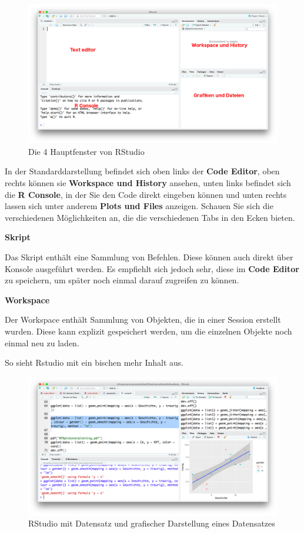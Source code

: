 \documentclass[]{book}
\begin{document}
\begin{figure}
\centering
\includegraphics{./img/RStudio-look.png}
\caption{Die 4 Hauptfenster von RStudio}
\end{figure}

In der Standarddarstellung befindet sich oben links der \textbf{Code
Editor}, oben rechts können sie \textbf{Workspace und History} ansehen,
unten links befindet sich die \textbf{R Console}, in der Sie den Code
direkt eingeben können und unten rechts lassen sich unter anderem
\textbf{Plots und Files} anzeigen. Schauen Sie sich die verschiedenen
Möglichkeiten an, die die verschiedenen Tabs in den Ecken bieten.

\textbf{Skript}

Das Skript enthält eine Sammlung von Befehlen. Diese können auch direkt
über Konsole ausgeführt werden. Es empfiehlt sich jedoch sehr, diese im
\textbf{Code Editor} zu speichern, um später noch einmal darauf
zugreifen zu können.

\textbf{Workspace}

Der Workspace enthält Sammlung von Objekten, die in einer Session
erstellt wurden. Diese kann explizit gespeichert werden, um die
einzelnen Objekte noch einmal neu zu laden.

So sieht Rstudio mit ein bischen mehr Inhalt aus.

\begin{figure}
\centering
\includegraphics{./img/ScreenGrafik.png}
\caption{RStudio mit Datensatz und grafischer Darstellung eines
Datensatzes}
\end{figure}
\end{document}
